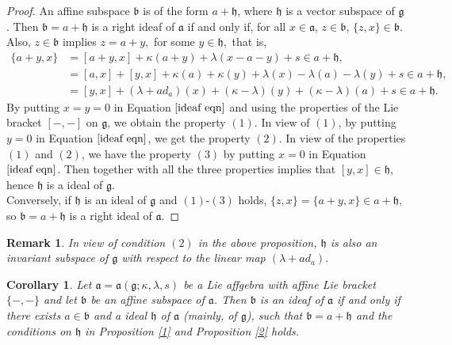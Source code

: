 \documentclass{article}
\newtheorem{remark}{Remark}[section]
\newtheorem{corollary}{Corollary}[theorem]
\theoremstyle{definition}
\theoremstyle{remark}
\theoremstyle{plain}
\begin{document}
\begin{proof}
    An affine subspace $\mathfrak{b}$ is of the form $a+\mathfrak{h}$, where $\mathfrak{h}$ is a vector subspace of $\mathfrak{g}$. Then $\mathfrak{b}=a+\mathfrak{h}$ is a right ideaf of $\mathfrak{a}$ if and only if, for all $x\in \mathfrak{a} $, $z \in \mathfrak{b}$, $\{z, x\} \in \mathfrak{b}$. Also, $z\in \mathfrak{b}$ implies $z= a+y,$ for some $y\in \mathfrak{h},$ that is, 
\begin{align} 
    \{a+y, x\}&=[a+y, x]+\kappa(a+y)+\lambda(x-a-y)+s \in a+\mathfrak{h},\nonumber \\ 
              &=[a, x]+[y, x]+\kappa(a)+\kappa(y)+\lambda(x)-\lambda(a)-\lambda(y)+s \in a+\mathfrak{h},\nonumber \\  
               &=[y, x]+(\lambda +ad_{a})(x)+(\kappa- \lambda)(y)+(\kappa-\lambda)(a)+s \in a+\mathfrak{h}.  \label{ideaf eqn}
\end{align}
By putting $x=y=0$ in Equation $\ref{ideaf eqn}$ and using the properties of the Lie bracket $[-, -]$ on $\mathfrak{g}$, we obtain the property $(1)$. In view of $(1)$, by putting $y=0$ in Equation $\ref{ideaf eqn}$, we get the property $(2)$. In view of the properties $(1)$ and $(2)$, we have the property $(3)$ by putting $x=0$ in Equation $\ref{ideaf eqn}$. Then together with all the three properties implies that $[y, x] \in \mathfrak{h}$, hence $\mathfrak{h}$ is a ideal of $\mathfrak{g}$.\\
Conversely, if $\mathfrak{h}$ is an ideal of $\mathfrak{g}$ and $(1)$-$(3)$ holds, $\{z, x\}=\{a+y, x\} \in a+ \mathfrak{h},$ so $\mathfrak{b}=a+\mathfrak{h}$ is a right ideal of $\mathfrak{a}.$
\end{proof}
\begin{remark}
     In view of condition $(2)$ in the above proposition, $\mathfrak{h}$ is also an invariant subspace of $\mathfrak{g}$ with respect to the linear map $(\lambda+ad_{a}).$
\end{remark}
\begin{corollary}
     Let $\mathfrak{a}=\mathfrak{a}(\mathfrak{g}; \kappa, \lambda, s)$ be a Lie affgebra with affine Lie bracket $\{-, -\}$ and let $\mathfrak{b}$ be an affine subspace of $\mathfrak{a}$. Then $\mathfrak{b}$ is an ideaf of $\mathfrak{a}$ if and only if there exists $a\in \mathfrak{b}$ and a ideal $\mathfrak{h}$ of $\mathfrak{a}$ (mainly, of $\mathfrak{g}$), such that $\mathfrak{b}=a+\mathfrak{h}$ and the conditions on $\mathfrak{h}$ in Proposition \ref{1} and Proposition \ref{2} holds.
\end{corollary}
\end{document}
